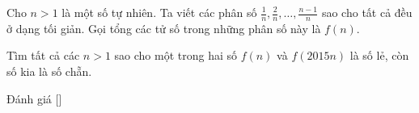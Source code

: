 \ifshowproblem
\begin{problem}\label{problem:RUS-2015-MO-11-P2}
    Cho \( n > 1 \) là một số tự nhiên. Ta viết các phân số \( \frac{1}{n}, \frac{2}{n}, \ldots, \frac{n-1}{n} \)
    sao cho tất cả đều ở dạng tối giản. Gọi tổng các tử số trong những phân số này là \( f(n) \).
    
    Tìm tất cả các \( n > 1 \) sao cho một trong hai số \( f(n) \) và \( f(2015n) \) là số lẻ, còn số kia là số chẵn.
\end{problem}
\fi

\ifshowinfo
Đánh giá [\textbf{}]\footnotemark
{}
\fi